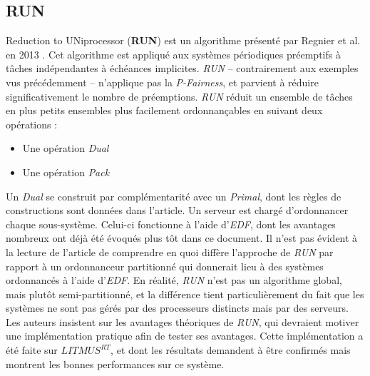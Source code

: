\documentclass[11pt,a4paper,oneside]{report}
\newcommand{\customhighlight}[1]{{\textbf{#1}}}
\begin{document}
	\subsection{RUN}
	Reduction to UNiprocessor (\customhighlight{RUN}) est un algorithme présenté par Regnier et al. en 2013 \cite{regnier_multiprocessor_2013}. 
	Cet algorithme est appliqué aux systèmes périodiques préemptifs à tâches indépendantes à 
	échéances implicites. \textit{RUN} -- contrairement aux exemples vus précédemment -- n'applique pas 
	la \textit{P-Fairness}, et parvient à réduire significativement le nombre de préemptions. 
	\textit{RUN} réduit un ensemble de tâches en plus petits ensembles plus facilement ordonnançables 
	en suivant deux opérations :\medskip
	\begin{itemize}
		\item Une opération \og \textit{Dual}\fg{} 
		\item Une opération \og \textit{Pack}\fg{} 
	\end{itemize}
	Un \textit{Dual} se construit par complémentarité avec un \textit{Primal}, dont les règles de constructions sont 
	données dans l'article.
	Un serveur est chargé d'ordonnancer chaque sous-système. Celui-ci fonctionne à l'aide 
	d'\textit{EDF}, dont les avantages nombreux ont déjà été évoqués plus tôt dans ce document. 
	Il n'est pas évident à la lecture de l'article de comprendre en quoi 
	diffère l'approche de \textit{RUN} par rapport à un ordonnanceur 
	partitionné qui donnerait lieu à des systèmes ordonnancés à l'aide d'\textit{EDF}. 
	En réalité, \textit{RUN} n'est pas un algorithme global, mais plutôt 
	semi-partitionné, et la différence tient particulièrement du fait que les systèmes ne sont pas 
	gérés par des processeurs distincts mais par des serveurs.  
	Les auteurs insistent sur les avantages théoriques de \textit{RUN}, qui devraient motiver une implémentation 
	pratique afin de tester ses avantages. Cette implémentation a été faite 
	\cite{compagnin_putting_2014} sur $LITMUS^{RT}$, et dont les résultats demandent à 
	être confirmés mais montrent les bonnes performances sur ce système.\medskip
	
\end{document}
